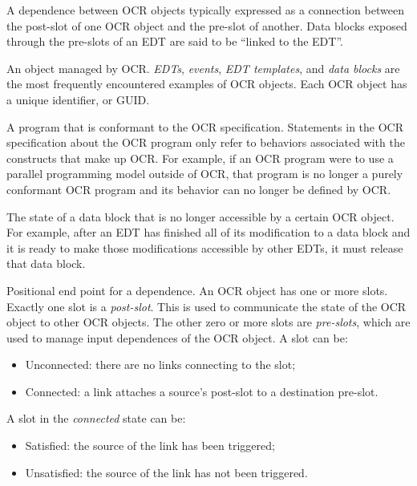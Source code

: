 
\glossarydefstart
A dependence between OCR objects typically expressed as a connection
between the post-slot of one OCR object and the pre-slot of
another. Data blocks exposed through the pre-slots of an EDT are said
to be ``linked to the EDT''.
\glossarydefend

\glossarydefstart
An object managed by OCR. \emph{EDTs}, \emph{events},
\emph{EDT templates}, and \emph{data blocks} are the most frequently
encountered examples of OCR objects. Each OCR object has a unique
identifier, or GUID.
\glossarydefend

\glossarydefstart
A program that is conformant to the OCR specification. Statements in
the OCR specification about the OCR program only refer to behaviors
associated with the constructs that make up OCR. For example, if an
OCR program were to use a parallel programming model outside of OCR,
that program is no longer a purely conformant OCR program and its
behavior can no longer be defined by OCR.
\glossarydefend

\glossarydefstart
The state of a data block that is no longer accessible by a certain OCR
object. For example, after an EDT has finished all of its
modification to a data block and it is ready to make those
modifications accessible by other EDTs, it must release that data
block.
\glossarydefend

\glossarydefstart
Positional end point for a dependence. An OCR object has one or more
slots. Exactly one slot is a \emph{post-slot}. This is used to
communicate the state of the OCR object to other OCR objects. The
other zero or more slots are \emph{pre-slots}, which are used to manage
input dependences of the OCR object. A slot can be:
\begin{itemize}
\item Unconnected: there are no links connecting to the slot;
\item Connected: a link attaches a source's post-slot to a destination pre-slot.
\end{itemize}
A slot in the \emph{connected} state can be:
\begin{itemize}
\item Satisfied: the source of the link has been triggered;
\item Unsatisfied: the source of the link has not been triggered.
\end{itemize}
\glossarydefend

